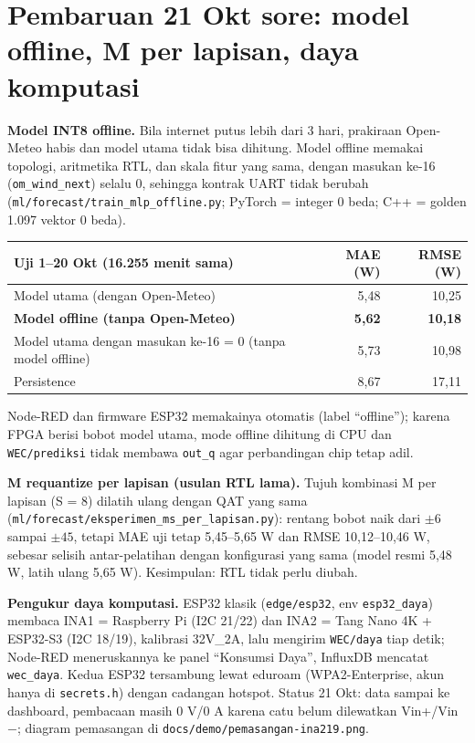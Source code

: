 \documentclass[10.5pt,a4paper]{article}
\newcommand{\cmd}[1]{\texttt{#1}}
\begin{document}
\section{Pembaruan 21 Okt sore: model offline, M per lapisan, daya komputasi}\label{sec:v3}
\textbf{Model INT8 offline.} Bila internet putus lebih dari 3 hari, prakiraan Open-Meteo habis dan model utama tidak bisa dihitung. Model offline memakai
topologi, aritmetika RTL, dan skala fitur yang sama, dengan masukan ke-16 (\cmd{om\_wind\_next}) selalu 0, sehingga kontrak UART tidak berubah
(\cmd{ml/forecast/train\_mlp\_offline.py}; PyTorch = integer 0 beda; C++ = golden 1.097 vektor 0 beda).
\begin{center}
\small
\begin{tabularx}{0.85\linewidth}{@{}X r r@{}}
\toprule
Uji 1--20 Okt (16.255 menit sama) & MAE (W) & RMSE (W) \\
\midrule
Model utama (dengan Open-Meteo) & 5,48 & 10,25 \\
\textbf{Model offline (tanpa Open-Meteo)} & \textbf{5,62} & \textbf{10,18} \\
Model utama dengan masukan ke-16 = 0 (tanpa model offline) & 5,73 & 10,98 \\
Persistence & 8,67 & 17,11 \\
\bottomrule
\end{tabularx}
\end{center}
Node-RED dan firmware ESP32 memakainya otomatis (label ``offline''); karena FPGA berisi bobot model utama, mode offline dihitung di CPU dan
\cmd{WEC/prediksi} tidak membawa \cmd{out\_q} agar perbandingan chip tetap adil.

\textbf{M requantize per lapisan (usulan RTL lama).} Tujuh kombinasi M per lapisan (S = 8) dilatih ulang dengan QAT yang sama
(\cmd{ml/forecast/eksperimen\_ms\_per\_lapisan.py}): rentang bobot naik dari $\pm6$ sampai $\pm45$, tetapi MAE uji tetap 5,45--5,65 W dan RMSE
10,12--10,46 W, sebesar selisih antar-pelatihan dengan konfigurasi yang sama (model resmi 5,48 W, latih ulang 5,65 W). Kesimpulan: RTL tidak perlu diubah.

\textbf{Pengukur daya komputasi.} ESP32 klasik (\cmd{edge/esp32}, env \cmd{esp32\_daya}) membaca INA1 = Raspberry Pi (I2C 21/22) dan INA2 = Tang Nano 4K + ESP32-S3
(I2C 18/19), kalibrasi 32V\_2A, lalu mengirim \cmd{WEC/daya} tiap detik; Node-RED meneruskannya ke panel ``Konsumsi Daya'', InfluxDB mencatat \cmd{wec\_daya}.
Kedua ESP32 tersambung lewat eduroam (WPA2-Enterprise, akun hanya di \cmd{secrets.h}) dengan cadangan hotspot. Status 21 Okt: data sampai ke dashboard,
pembacaan masih 0 V/0 A karena catu belum dilewatkan Vin+/Vin$-$; diagram pemasangan di \cmd{docs/demo/pemasangan-ina219.png}.
\end{document}
